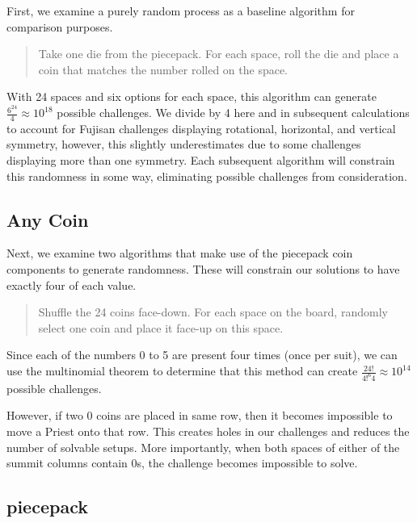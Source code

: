 \documentclass[journal]{IEEEtran}
\begin{document}
First, we examine a purely random process as a baseline algorithm for comparison purposes.

\begin{quote}
    
  Take one die from the piecepack. For each space, roll the die and place a coin that matches the number rolled on the space.
\end{quote}

With 24 spaces and six options for each space, this algorithm can generate $\frac{6^{24}}{4} \approx 10^{18}$ possible challenges. We divide by 4 here and in subsequent calculations to account for Fujisan challenges displaying rotational, horizontal, and vertical symmetry, however, this slightly underestimates due to some challenges displaying more than one symmetry. Each subsequent algorithm will constrain this randomness in some way, eliminating possible challenges from consideration.

\subsection{Any Coin}

Next, we examine two algorithms that make use of the piecepack coin components to generate randomness. These will constrain our solutions to have exactly four of each value.

\begin{quote}
    
  Shuffle the 24 coins face-down. For each space on the board, randomly select one coin and place it face-up on this space.
  
\end{quote}

Since each of the numbers 0 to 5 are present four times (once per suit), we can use the multinomial theorem to determine that this method can create
$\frac{24!}{4!^{6}4} \approx 10^{14}$ possible challenges. 

However, if two 0 coins are placed in same row, then it becomes impossible to move a Priest onto that row. This creates holes in our challenges and reduces the number of solvable setups. 
More importantly, when both spaces of either of the summit columns contain 0s, the challenge becomes impossible to solve.


\subsection{piecepack}
\end{document}
